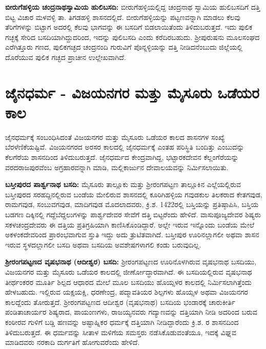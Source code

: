 \textbf{ಬೀರುಗೆಹಳ್ಳಿಯ ಚಂದ್ರನಾಥಸ್ವಾಮಿಯ ಹುಲಿಬಸದಿ:} ಬೀರುಗೆಹಳ್ಳಿಯಲ್ಲಿದ್ದ ಚಂದ್ರನಾಥ ಸ್ವಾಮಿಯ ಹುಲಿಬಸದಿಗೆ ದತ್ತಿ ಬಿಟ್ಟ ವಿಚಾರ ಮಳವಳ್ಳಿ ತಾ. ತಿಗಡಹಳ್ಳಿ ಶಾಸನದಲ್ಲಿದೆ. ಬೀರುಗೆಹಳ್ಳಿಯನ್ನು ಪಟ್ಟಣವನ್ನಾಗಿ ಮಾಡಲು ಕೆಲವು ತೆರಿಗೆಗಳನ್ನು ಬಿಟ್ಟಾಗ ಅದರಲ್ಲಿ ಕೆಲವು ಭಾಗವನ್ನು ಈ ಬಸದಿಗೆ ಬಿಡಲಾಯಿತೆಂದು ತಿಳಿದುಬರುತ್ತದೆ. ಇದು ಪುಲಿಕ ಗಚ್ಛಕ್ಕೆ ಸೇರಿದ ಬಸದಿಯಾಗಿದ್ದುದರಿಂದ, ಇದನ್ನು ಪುಲಿಬಸದಿ ಎಂದು ಕರೆದಿರಬಹುದು. ಶ‍್ರೀಪುರುಷನು ಮೂಲಸಂಘದ ಎರೆಗಿತ್ತೂರು ಗಣದ, ಪುಲಿಕಗಚ್ಛದ ಚಂದ್ರನಂದಿ ಗುರುವಿಗೆ ಪೊನ್ನಳ್ಳಿಯನ್ನು ದತ್ತಿ ನೀಡಿದನೆಂಬುದು ಜಿಲ್ಲೆಯಲ್ಲಿ ದೊರೆಯುವ ಪುಲಿಕ ಗಚ್ಛದ ಪ್ರಾಚೀನ ಉಲ್ಲೇಖವಾಗಿದೆ. 


\section*{ಜೈನಧರ್ಮ - ವಿಜಯನಗರ ಮತ್ತು ಮೈಸೂರು ಒಡೆಯರ ಕಾಲ}

ಜೈನಧರ್ಮಕ್ಕೆ ಸಂಬಂಧಿಸಿದಂತೆ ವಿಜಯನಗರ ಮತ್ತು ಮೈಸೂರು ಒಡೆಯರ ಕಾಲದ ಶಾಸನಗಳ ಸಂಖ್ಯೆ ಬೆರಳೆಣಿಕೆಯಷ್ಟಿವೆ. ವಿಜಯನಗರದ ಅರಸರ ಕಾಲದಲ್ಲಿ ಜೈನಧರ್ಮಕ್ಕೆ ಎಂತಹ ಪರಿಸ್ಥಿತಿ ಬಂದಿತ್ತು ಎಂಬುದನ್ನು ಕೆಲಗೆರೆಯ ಶಾಸನದಿಂದ ತಿಳಿದುಬರುತ್ತದೆ. ಜೈನಧರ್ಮದ ಕೇಂದ್ರವಾಗಿದ್ದ, ಭಟ್ಟಾರಕದೇವನ ಕೆಲ್ಲಂಗೆರೆಯನ್ನು ವರದರಾಜಪುರವೆಂಬ ಅಗ್ರಹಾರವನ್ನಾಗಿ ಮಾಡಿ, ಮಲ್ಲಿಕಾರ್ಜುನ ದೇವಾಲಯವನ್ನು ನಿರ್ಮಿಸಲಾಯಿತು.

\textbf{ಬಸ್ತೀಪುರದ ಪಾರ್ಶ್ವನಾಥ ಬಸದಿ:} ಮೈಸೂರು ತಾಲ್ಲೂಕು ಮತ್ತು ಶ‍್ರೀರಂಗಪಟ್ಟಣ ತಾಲ್ಲೂಕಿನ ಎಲ್ಲೆಯಲ್ಲಿರುವ ಬಸ್ತೀಪುರದ ಸರಹದ್ದಿನಲ್ಲಿರುವ ಬಂಡೆಯ ಮೇಲಿರುವ ಶಾಸನದಲ್ಲಿ ಕೂರಿಗಿಹಳ್ಳಿಯ ಗವುಡಕುಲ ತಿಲಕರಾದ ಕೇತಗವುಡ, ರಾಮಗವುಡ, ಸಂಬುವಗವುಡ, ಮಾದಿಗವುಡ ಮೊದಲಾದವರು, ಕ್ರಿ.ಶ. 1422ರಲ್ಲಿ ಬಸ್ತಿಯನ್ನು ಪ್ರತಿಷ್ಠಾಪಿಸಿ, ಬಸ್ತಿಯ ಬಡಗಣ ದಿಕ್ಕಿನಲ್ಲಿ ಗದ್ದೆಬೆದ್ದಲುಗಳನ್ನು ಪಾರ್ಶ್ವದೇವರ ಸೇವೆಗೆ ದತ್ತಿ ಬಿಟ್ಟರೆಂದು ಹೇಳಿದೆ. ವಾಸುಪೂಜ್ಯದೇವರ ಶಿಷ್ಯರು ಸಕಳಚಂದ್ರದೇವರು ಈ ದತ್ತಿಯ ಪ್ರತಿಗ್ರಹಿಯಾಗಿ ಕಾಣಿಸಿಕೊಂಡಿ\-ದ್ದಾರೆ. ಅಲ್ಲೇ ಇರುವ ಇನ್ನೊಂದು ಬಂಡೆಯ ಮೇಲೆ ಅಕಳಂಕದೇವರಿಂದ ಪ್ರಾರಂಭವಾಗುವ ಸ್ತುತಿ ಇದ್ದು ಅದು ತ್ರುಟಿತವಾಗಿದೆ. ಬಸ್ತೀಪುರ ಊರಿನಲ್ಲಾಗಲೀ ಅಥವಾ ಶಾಸನ ಇರುವ ಸ್ಥಳದಲ್ಲಾಗಲೀ ಬಸದಿ ಅಥವಾ ಬಸದಿಯ ಅವಶೇಷಗಳಾಗಲಿ ಕಂಡು ಬರುವುದಿಲ್ಲ.

\textbf{ಶ‍್ರೀರಂಗಪಟ್ಟಣದ ವೃಷಭನಾಥ (ಆದೀಶ್ವರ) ಬಸದಿ:} ಶ‍್ರೀರಂಗಪಟ್ಟಣದ ಊರಿನೊಳಗಿರುವ ವೃಷಭನಾಥ ಬಸದಿಯು, ವಿಜಯನಗರ ಮತ್ತು ಮೈಸೂರು ಒಡೆಯರ ಕಾಲದಲ್ಲಿ ಜೀರ್ಣೋದ್ಧಾರವಾಗಿದೆ. ಈ ಬಸದಿಯಲ್ಲಿರುವ ವೃಷಭನಾಥ ತೀರ್ಥಂಕರರ ಮೂರ್ತಿ ಶಿಲ್ಪದ ಆಧಾರದ ಮೇಲೆ ಮೂಲ ಬಸದಿಯು ಹೊಯ್ಸಳರ ಕಾಲದಲ್ಲಿ ನಿರ್ಮಿಸಲಾಗಿತ್ತೆಂದು ಹೇಳಬಹುದು. ಇಲ್ಲಿರುವ ಯಕ್ಷಯಕ್ಷಿ, ಧರಣೇಂದ್ರ, ಪದ್ಮಾವತಿಯರ ಶಿಲ್ಪಗಳು ಹೊಯ್ಸಳ ಅಥವಾ ವಿಜಯನಗರ ಕಾಲದ್ದೆಂದು ತೋರುತ್ತದೆ. ಶ‍್ರೀರಂಗಪಟ್ಟಣದ ಆದೀಶ್ವರ (ವೃಷಭನಾಥ) ಬಸದಿಯ ಭಂಡಾರಕ್ಕೆ ಚಾರುಕೀರ್ತಿ ಪಂಡಿತಾ\-ಚಾರ್ಯರ ಶಿಷ್ಯರಾದ, ಪಾಯಂಣಗಳು, ರಾಜಯ್ಯನವರು  ಗದ್ಯಾಣವನ್ನು ದತ್ತಿಯಾಗಿ ನೀಡಿ ಅದರಿಂದ ಬರುವ ಕಂಠೀರವ ಗುಳಿಗೆ  ಬಡ್ಡಿ ಹಣವನ್ನು ಅಷ್ಟಾಹ್ನಿಕರ ಧರ್ಮಕ್ಕೆ ದತ್ತಿಯಾಗಿ ನೀಡಿದ್ದಾರೆಂದು ಕ್ರಿ.ಶ. ರ ಶಾಸನದಿಂದ ತಿಳಿದುಬರುತ್ತದೆ. ಈ ಧರ್ಮವನ್ನು ಸೀತಾಳ ಮಳಿಗೆಯ ಸಮಸ್ತರು ನಡೆಸಿಕೊಡುವಂತೆಯೂ, ಇದಕ್ಕೆ ವಿಘ್ನವ ಮಾಡಿದವರು ನರಕಾದಿ ದುರ್ಗತಿಗೆ ಹೋಗುವರೆಂದು ಹೇಳಿದೆ.

